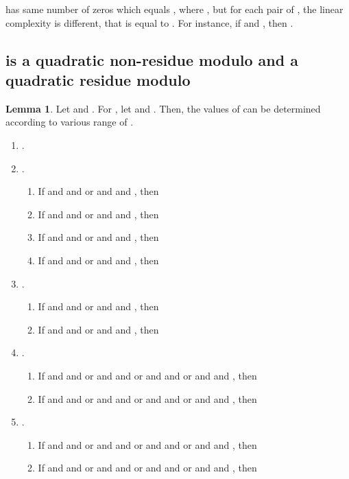 \documentclass{mcom-l}
\theoremstyle{definition}
\newtheorem{sec3lemma10}[sec3lemma1]{Lemma}
\numberwithin{equation}{section}
\begin{document}
      has same number of zeros which equals , where , but for each pair of , the linear complexity is different, that is equal to . For instance, if  and , then .
    \subsection{ is a quadratic non-residue  modulo  and a quadratic residue modulo }
    
    \begin{sec3lemma10}\label{lab_sec3_lemma10}
    Let  and . For , let  and . Then, the values of  can be determined according to various range of .
    \begin{enumerate} \item .
    
    \item .
    \begin{enumerate}
    \item
    If  and  and  or  and  and , then
     
    \item
    If  and  and  or  and  and , then
     
    \item
    If  and  and  or  and  and , then
     
    \item
    If  and  and  or  and  and , then
       
    \end{enumerate}
    \item .
    \begin{enumerate}
    \item
    If  and  and  or  and  and , then
     
    \item
    If  and  and  or  and  and , then
      
    \end{enumerate}
    \item .
    \begin{enumerate}
    \item
    If   and  and  or   and  and  or   and  and  or   and  and , then
    
    \item
    If   and  and  or  and  and  or   and  and  or  and  and , then
    
    \end{enumerate}
     \item .
       \begin{enumerate}
       \item
       If   and  and  or   and  and  or   and  and  or   and  and , then
       
       \item
       If   and  and  or   and  and  or   and  and  or   and  and , then
       
       \end{enumerate}
    \end{enumerate}
    \end{sec3lemma10}
\end{document}
